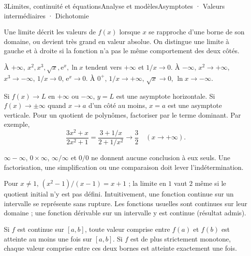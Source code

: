 \begin{ouverture}[continuite]{3}{Limites, continuité et équations}{Analyse et modèles}{Asymptotes · Valeurs intermédiaires · Dichotomie}
\end{ouverture}
\essentiel

Une limite décrit les valeurs de $f(x)$ lorsque $x$ se rapproche d'une borne de son domaine, ou devient très grand en valeur absolue. On distingue une limite à gauche et à droite si la fonction n'a pas le même comportement des deux côtés.
\begin{propriete}
À $+\infty$, $x^2,x^3,\sqrt x,\mathrm e^x,\ln x$ tendent vers $+\infty$ et $1/x\to0$.
À $-\infty$, $x^2\to+\infty$, $x^3\to-\infty$, $1/x\to0$, $\mathrm e^x\to0$.
À $0^+$, $1/x\to+\infty$, $\sqrt x\to0$, $\ln x\to-\infty$.
\end{propriete}
Si $f(x)\to L$ en $+\infty$ ou $-\infty$, $y=L$ est une asymptote horizontale. Si $f(x)\to\pm\infty$ quand $x\to a$ d'un côté au moins, $x=a$ est une asymptote verticale.
Pour un quotient de polynômes, factoriser par le terme dominant. Par exemple,
\[\frac{3x^2+x}{2x^2+1}=\frac{3+1/x}{2+1/x^2}\longrightarrow\frac32\quad(x\to+\infty).\]
\begin{attention}
$\infty-\infty$, $0\times\infty$, $\infty/\infty$ et $0/0$ ne donnent aucune conclusion à eux seuls.
Une factorisation, une simplification ou une comparaison doit lever l'indétermination.
\end{attention}
Pour $x\ne1$, $(x^2-1)/(x-1)=x+1$ ; la limite en $1$ vaut $2$ même si le quotient initial n'y est pas défini.
Intuitivement, une fonction continue sur un intervalle se représente sans rupture. Les fonctions usuelles sont continues sur leur domaine ; une fonction dérivable sur un intervalle y est continue (résultat admis).
\begin{theoreme}
Si $f$ est continue sur $[a,b]$, toute valeur comprise entre $f(a)$ et $f(b)$ est atteinte au moins une fois sur $[a,b]$.
Si $f$ est de plus strictement monotone, chaque valeur comprise entre ces deux bornes est atteinte exactement une fois.
\end{theoreme}
